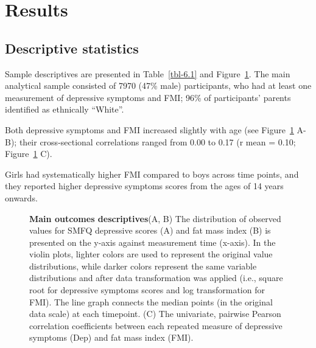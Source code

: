 \documentclass[
  letterpaper,
  DIV=11,
  numbers=noendperiod]{scrreport}
\begin{document}
\section{Results}\label{results-2}

\subsection{Descriptive statistics}\label{descriptive-statistics}

Sample descriptives are presented in Table~\ref{tbl-6.1} and
Figure~\ref{fig-6.1}. The main analytical sample consisted of 7970 (47\%
male) participants, who had at least one measurement of depressive
symptoms and FMI; 96\% of participants' parents identified as ethnically
``White''.

Both depressive symptoms and FMI increased slightly with age (see
Figure~\ref{fig-6.1} A-B); their cross-sectional correlations ranged
from 0.00 to 0.17 (r mean = 0.10; Figure~\ref{fig-6.1} C).

Girls had systematically higher FMI compared to boys across time points,
and they reported higher depressive symptoms scores from the ages of 14
years onwards.

\begin{figure}[H]


\caption{\label{fig-6.1}\textbf{Main outcomes descriptives}\newline(A,
B) The distribution of observed values for SMFQ depressive scores (A)
and fat mass index (B) is presented on the y-axis against measurement
time (x-axis). In the violin plots, lighter colors are used to represent
the original value distributions, while darker colors represent the same
variable distributions and after data transformation was applied (i.e.,
square root for depressive symptoms scores and log transformation for
FMI). The line graph connects the median points (in the original data
scale) at each timepoint. (C) The univariate, pairwise Pearson
correlation coefficients between each repeated measure of depressive
symptoms (Dep) and fat mass index (FMI).}

\end{figure}%
\end{document}

